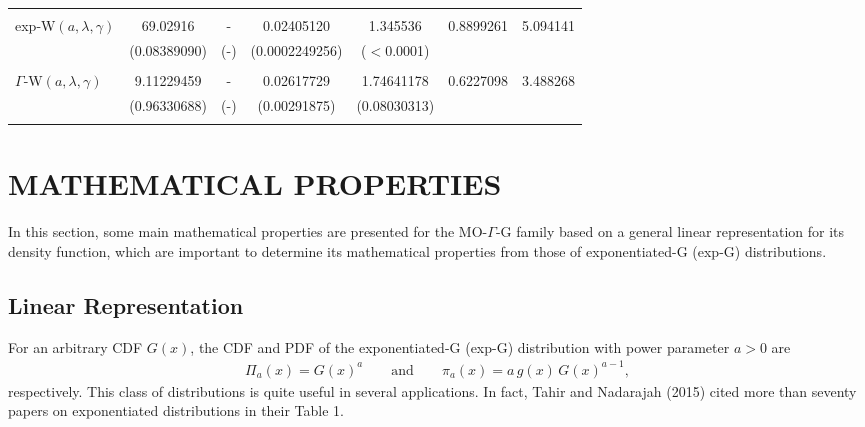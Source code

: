 \documentclass[twoside,leqno,11pt]{article}
\begin{document}
\begin{table}[htb!]
\begin{tabular}{lcccccc}
 & & & & &  \\
 exp-W$(a,\lambda,\gamma)$   &    69.02916  & - &   0.02405120 & 1.345536 &   0.8899261   & 5.094141 \\
                          &   (0.08389090) & (-) & (0.0002249256) & ($<$0.0001)   &  & \\

 & & & & &  \\
 $\Gamma$-W$(a,\lambda,\gamma)$    & 9.11229459   & - &  0.02617729 & 1.74641178 &    0.6227098 & 3.488268  \\
                             &  (0.96330688)&  (-)&  (0.00291875) & (0.08030313)     &  & \\

 & & & & &  \\




                                                    \hline
\end{tabular}
\end{table}



\section{MATHEMATICAL PROPERTIES}\label{properties}


In this section, some main mathematical properties are presented for the MO-$\Gamma$-G family
based on a general linear representation for its density function, which are important
to determine its mathematical properties from those of exponentiated-G (exp-G) distributions.

\subsection{Linear Representation}


For an arbitrary CDF $G(x)$, the CDF and PDF of the exponentiated-G (exp-G) distribution with power parameter $a>0$ are
\begin{eqnarray*}
\Pi_a(x)=G(x)^a\qquad\text{and}\qquad\pi_a(x)=a\,g(x)\,G(x)^{a-1},
\end{eqnarray*}
respectively. This class of distributions is quite useful in several applications. In fact, Tahir and Nadarajah (2015)
cited more than seventy papers on exponentiated distributions in their Table 1.
\end{document}
